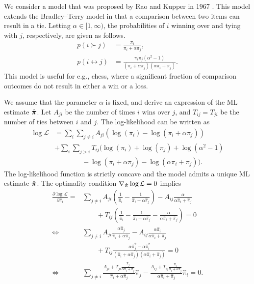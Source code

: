 We consider a model that was proposed by Rao and Kupper in 1967 \citep{rao1967ties}.
This model extends the Bradley--Terry model in that a comparison between two items can result in a tie.
Letting $\alpha \in [1, \infty)$, the probabilities of $i$ winning over and tying with $j$, respectively, are given as follows.
\begin{align*}
p(i \succ j) &= \frac{\pi_i}{\pi_i + \alpha \pi_j}, \\
p(i \leftrightarrow j) &= \frac{\pi_i \pi_j(\alpha^2 - 1)}{(\pi_i + \alpha\pi_j)(\alpha \pi_i + \pi_j)}.
\end{align*}
This model is useful for e.g., chess, where a significant fraction of comparison outcomes do not result in either a win or a loss.

We assume that the parameter $\alpha$ is fixed, and derive an expression of the ML estimate $\hat{\bm{\pi}}$.
Let $A_{ji}$ be the number of times $i$ wins over $j$, and $T_{ij} = T_{ji}$ be the number of ties between $i$ and $j$.
The log-likelihood can be written as
\begin{align}
\log \mathcal{L} &=
  \sum_i \sum_{j \ne i}
  A_{ji} \left( \log(\pi_i) - \log(\pi_i + \alpha \pi_j) \right) \\
    &+ \sum_i \sum_{j > i} \nonumber
    T_{ij} ( \log(\pi_i) + \log(\pi_j) + \log(\alpha^2 - 1) \\
    & \qquad \qquad {} - \log(\pi_i + \alpha \pi_j) - \log(\alpha \pi_i + \pi_j) ). \nonumber
\end{align}
The log-likelihood function is strictly concave and the model admits a unique ML estimate $\hat{\bm{\pi}}$.
The optimality condition $\nabla_{\hat{\bm{\pi}}} \log \mathcal{L} = 0$ implies
\begin{align}
  \frac{\partial \log \mathcal{L}}{\partial \hat{\pi}_i}
  = &\sum_{j \ne i} A_{ji} \left( \frac{1}{\hat{\pi}_i} - \frac{1}{\hat{\pi}_i + \alpha \hat{\pi}_j} \right)
    - A_{ij} \frac{\alpha}{\alpha \hat{\pi}_i + \hat{\pi}_j} \\
  & \qquad {} + T_{ij} \left( \frac{1}{\hat{\pi}_i} - \frac{1}{\hat{\pi}_i + \alpha \hat{\pi}_j} - \frac{\alpha}{\alpha \hat{\pi}_i + \hat{\pi}_j}\right) = 0 \\
  \iff & \sum_{j \ne i} A_{ji} \frac{\alpha \hat{\pi}_j}{\hat{\pi}_i + \alpha \hat{\pi}_j}
    - A_{ij} \frac{\alpha \hat{\pi}_i}{\alpha \hat{\pi}_i + \hat{\pi}_j} \\
  & \qquad {} + T_{ij} \frac{\alpha \hat{\pi}_j^2 - \alpha \hat{\pi}_i^2}{(\hat{\pi}_i + \alpha \hat{\pi}_j)(\alpha \hat{\pi}_i + \hat{\pi}_j)} = 0 \\
  \iff & \sum_{j \ne i} \frac{A_{ji} + T_{ji}\tfrac{\hat{\pi}_j}{\alpha \hat{\pi}_i + \hat{\pi}_j}}{\hat{\pi}_i + \alpha \hat{\pi}_j} \hat{\pi}_j
    - \frac{A_{ij} + T_{ij}\tfrac{\hat{\pi}_i}{\hat{\pi}_i + \alpha \hat{\pi}_j}}{\alpha \hat{\pi}_i + \hat{\pi}_j} \hat{\pi}_i = 0.
\end{align}

